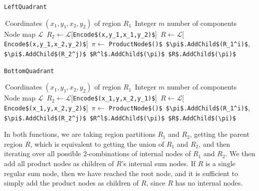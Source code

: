 \documentclass{amsart}
\theoremstyle{plain}
\numberwithin{equation}{section}
\newcommand{\code}[1]{\lstinline[mathescape=true]{#1}}
\newcommand{\mcode}[1]{\lstinline[mathescape]!#1!}
\begin{document}
\begin{algorithm}[h]
  \caption{\code{LeftQuadrant}}\label{alg:leftquadrant}
  \begin{algorithmic}[1]
    \Require\,Coordinates $(x_1,y_1,x_2,y_2)$ of region $R_1$
    \Require\,Integer $m$ number of components
    \Require\,Node map $\mathcal{L}$
      \State\,$R_2\gets \mathcal{L}[$\mcode{Encode$(x,y_1,x_1,y_2)$}$]$
      \State\,$R\gets\mathcal{L}[$\mcode{Encode$(x,y_1,x_2,y_2)$}$]$
          \State\,$\pi\gets$ \mcode{ProductNode$()$}
          \State\,\mcode{$\pi$.AddChild$(R_1^i)$}, \mcode{$\pi$.AddChild$(R_2^j)$}
              \State\,\mcode{$R^l$.AddChild$(\pi)$}
            \EndFor%
          \Else{}
            \State\,\mcode{$R$.AddChild$(\pi)$}
          \EndIf%
        \EndFor%
      \EndFor%
    \EndFor%
  \end{algorithmic}
\end{algorithm}

\begin{algorithm}[h]
  \caption{\code{BottomQuadrant}}\label{alg:bottomquadrant}
  \begin{algorithmic}[1]
    \Require\,Coordinates $(x_1,y_1,x_2,y_2)$ of region $R_1$
    \Require\,Integer $m$ number of components
    \Require\,Node map $\mathcal{L}$
      \State\,$R_2\gets\mathcal{L}[$\mcode{Encode$(x_1,y,x_2,y_1)$}$]$
      \State\,$R\gets\mathcal{L}[$\mcode{Encode$(x_1,y,x_2,y_2)$}$]$
          \State\,$\pi\gets$ \mcode{ProductNode$()$}
          \State\,\mcode{$\pi$.AddChild$(R_1^i)$}, \mcode{$\pi$.AddChild$(R_2^j)$}
              \State\,\mcode{$R^l$.AddChild$(\pi)$}
            \EndFor%
          \Else{}
            \State\,\mcode{$R$.AddChild$(\pi)$}
          \EndIf%
        \EndFor%
      \EndFor%
    \EndFor%
  \end{algorithmic}
\end{algorithm}

In both functions, we are taking region partitions $R_1$ and $R_2$, getting the parent region $R$,
which is equivalent to getting the union of $R_1$ and $R_2$, and then iterating over all possible
2-combinations of internal nodes of $R_1$ and $R_2$. We then add all product nodes as children of
$R$'s internal sum nodes. If $R$ is a single regular sum node, then we have reached the root node,
and it is sufficient to simply add the product nodes as children of $R$, since $R$ has no internal
nodes.
\end{document}
